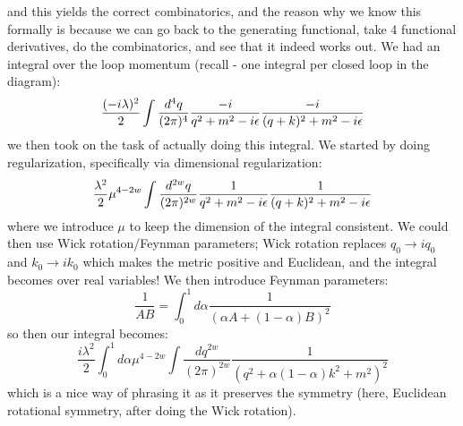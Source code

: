 and this yields the correct combinatorics, and the reason why we know this formally is because we can go back to the generating functional, take 4 functional derivatives, do the combinatorics, and see that it indeed works out. We had an integral over the loop momentum (recall - one integral per closed loop in the diagram):
\begin{equation}
    \frac{(-i\lambda)^2}{2}\int \frac{d^4q}{(2\pi)^4}\frac{-i}{q^2 + m^2 - i\epsilon}\frac{-i}{(q+k)^2 + m^2 - i\epsilon}
\end{equation}
we then took on the task of actually doing this integral. We started by doing regularization, specifically via dimensional regularization:
\begin{equation}
    \frac{\lambda^2}{2}\mu^{4 - 2w}\int \frac{d^{2w}q}{(2\pi)^{2w}}\frac{1}{q^2 + m^2 - i\epsilon}\frac{1}{(q+k)^2 + m^2 - i\epsilon}
\end{equation}
where we introduce $\mu$ to keep the dimension of the integral consistent. We could then use Wick rotation/Feynman parameters; Wick rotation replaces $q_0 \to iq_0$ and $k_0 \to ik_0$ which makes the metric positive and Euclidean, and the integral becomes over real variables! We then introduce Feynman parameters:
\begin{equation}
    \frac{1}{AB} = \int_0^1 d\alpha \frac{1}{(\alpha A + (1 - \alpha)B)^2}
\end{equation}
so then our integral becomes:
\begin{equation}
    \frac{i\lambda^2}{2}\int_0^1 d\alpha \mu^{4-2w}\int \frac{dq^{2w}}{(2\pi)^{2w}}\frac{1}{(q^2 + \alpha(1-\alpha)k^2 + m^2)^2}
\end{equation}
which is a nice way of phrasing it as it preserves the symmetry (here, Euclidean rotational symmetry, after doing the Wick rotation). 

